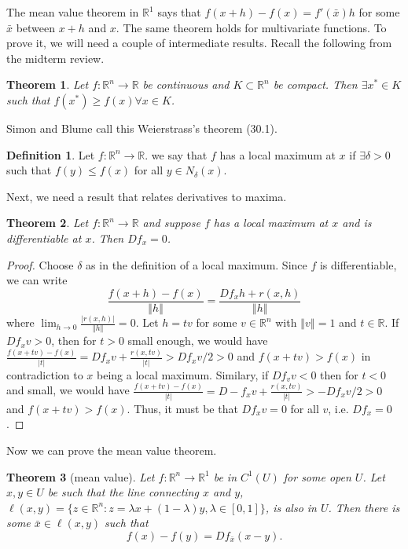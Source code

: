 \documentclass[12pt,reqno]{amsart}
\newtheorem{theorem}{Theorem}[section]
\theoremstyle{definition}
\newtheorem{definition}{Definition}[section]
\def\R{\mathbb{R}}
\newcommand{\norm}[1]{\left\Vert {#1} \right\Vert}
\renewcommand{\to}{{\rightarrow}}
\begin{document}
The mean value theorem in $\R^1$ says that $f(x+h) - f(x) =
f'(\bar{x}) h$ for some $\bar{x}$ between $x+h$ and $x$. The same
theorem holds for multivariate functions. To prove it, we will need a
couple of intermediate results. Recall the following from the midterm
review. 
\begin{theorem}
  Let $f:\R^n \to \R$ be continuous and $K \subset \R^n$ be
  compact. Then $\exists x^* \in K$ such that $f(x^*) \geq f(x)
  \forall x \in K$. 
\end{theorem}
Simon and Blume call this Weierstrass's theorem (30.1). 
\begin{definition}
  Let $f: \R^n \to \R$. we say that $f$ has a local maximum at $x$ if
  $\exists \delta > 0$ such that $f(y) \leq f(x)$ for all $y \in
  N_\delta(x)$. 
\end{definition}
Next, we need a result that relates derivatives to maxima. 
\begin{theorem}
  Let $f: \R^n \to \R$ and suppose $f$ has a local maximum at $x$ and
  is differentiable at $x$. Then $Df_x = 0$. 
\end{theorem}
\begin{proof}
  Choose $\delta$ as in the definition of a local maximum. Since $f$
  is differentiable, we can write
  \[ \frac{f(x+h) - f(x)}{\norm{h}} =\frac{ Df_x h +
    r(x,h)}{\norm{h}} \] where $\lim_{h \to 0}
  \frac{|r(x,h)|}{\norm{h}} = 0$. Let $h = t v$ for some $v \in \R^n$
  with $\norm{v} =1$ and $t \in \R$. If $D f_x v > 0$, then for $t>0$
  small enough, we would have $\frac{f(x+tv) - f(x)}{|t|} = D
  f_x v + \frac{r(x,tv)}{|t|} > D
  f_x v / 2 > 0$ and $f(x+tv)> f(x)$ in contradiction to $x$ being a
  local maximum. Similary, if $D f_v v < 0$ then for $t<0$ and small,
  we would have $\frac{f(x+tv) - f(x)}{|t|} = D
  -f_x v + \frac{r(x,tv)}{|t|} > -D
  f_x v / 2 > 0$ and $f(x+tv)> f(x)$. Thus, it must be that $D f_x v =
  0$ for all $v$, i.e. $D f_x = 0$. 
\end{proof}
Now we can prove the mean value theorem.
\begin{theorem}[mean value]\label{thm:mvt}
  Let $f:\R^n \to \R^1$ be in $C^1(U)$ for some open $U$. Let $x, y
  \in U$ be such that the line connecting $x$ and $y$, $\ell(x,y) =
  \{z\in \R^n: z = \lambda x + (1-\lambda) y, \lambda \in [0,1]\}$, is
  also in $U$. Then there is some $\bar{x} \in \ell(x,y)$ such that
  \[ f(x) - f(y) = Df_{\bar{x}} (x-y). \]
\end{theorem}
\end{document}
